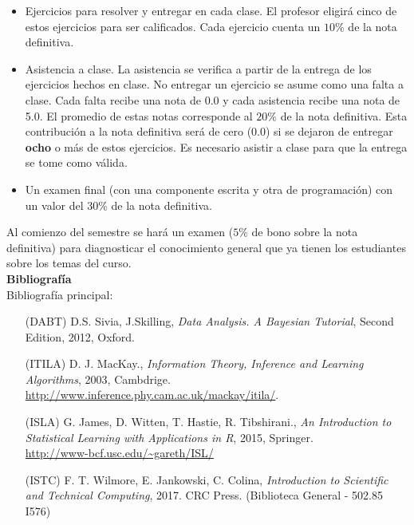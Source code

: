 \documentclass[letterpaper,10pt,onecolumn]{article}
\begin{document}
\begin{itemize}
\item 
Ejercicios para resolver y entregar en cada clase. 
El profesor eligir\'a cinco de estos ejercicios para ser calificados. 
Cada ejercicio cuenta un $10\%$ de la nota definitiva.

\item
Asistencia a clase. La asistencia se verifica a partir de la entrega de
los ejercicios hechos en clase. 
No entregar un ejercicio se asume como una falta a clase.
Cada falta recibe una nota de 0.0 y cada
asistencia recibe una nota de 5.0. 
El promedio de estas notas corresponde al $20\%$ de la nota
definitiva. 
Esta contribuci\'on a la nota definitiva ser\'a de cero (0.0) si se
dejaron de entregar {\bf ocho} o m\'as de estos ejercicios.
Es necesario asistir a clase para que la entrega se tome como
v\'alida. 
\item
Un examen final (con una componente escrita y otra de
programaci\'on) con un valor del $30\%$ de la nota definitiva.
\end{itemize}

Al comienzo del semestre se har\'a un examen ($5\%$ de bono
sobre la nota definitiva) para diagnosticar el conocimiento general
que ya tienen los estudiantes sobre los temas del curso. 
\\[0.1cm]

\noindent\textbf{\large {} \quad
  Bibliograf\'ia}\\[-0.2cm] 


\noindent\normalsize Bibliograf\'ia principal:

\begin{itemize}
\item [(DABT)] D.S. Sivia, J.Skilling, \textit{Data Analysis. A Bayesian Tutorial}, Second Edition, 2012, Oxford.\\[-0.6cm]
\item [(ITILA)] D. J. MacKay., \textit{Information Theory, Inference and
  Learning Algorithms}, 2003,
  Cambdrige. \\
  \url{http://www.inference.phy.cam.ac.uk/mackay/itila/}.
  \\[-0.6cm]  
\item [(ISLA)] G. James, D. Witten, T. Hastie, R. Tibshirani., \textit{An
  Introduction to Statistical Learning with Applications in R}, 2015,
  Springer. \\
  \url{http://www-bcf.usc.edu/~gareth/ISL/} \\[-0.6cm] 
\item [(ISTC)] F. T. Wilmore, E. Jankowski, C. Colina, \textit{Introduction
  to Scientific and Technical Computing}, 2017. CRC Press. (Biblioteca
  General - 502.85 I576)\\[-0.6cm] 

\end{itemize} 
\end{document}
